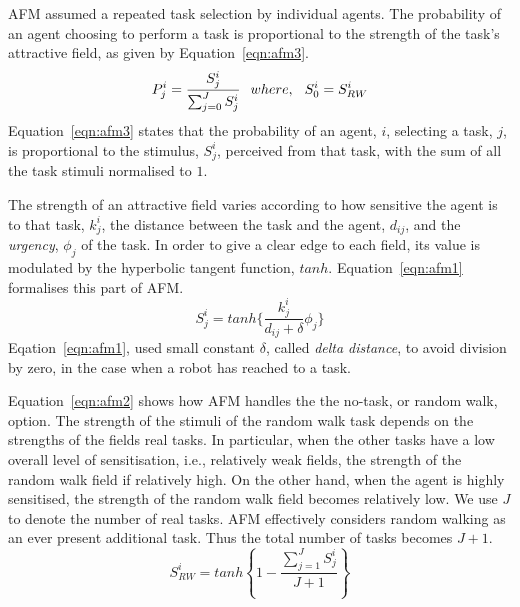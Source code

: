 \documentclass{intech}
\begin{document}
AFM assumed a repeated task selection by individual agents.  The probability of an agent choosing to perform a task is proportional to the strength of the task's attractive field, as given by Equation~\ref{eqn:afm3}.
\begin{equation}
P_{j}^{i} = \frac{S_{j}^{i}}{\sum_{j=0}^{J} S_{j}^{i}} \hspace*{0.25cm}where,\hspace*{0.25cm}S^{i}_{0} = S^{i}_{RW}   
\label{eqn:afm3}
\end{equation}
Equation~\ref{eqn:afm3} states that the probability of an agent, $i$, selecting a task, $j$, is proportional to the stimulus, $ S^i_j$, perceived from that task, with the sum of all the task stimuli normalised to $1$.

The strength of an attractive field varies according to how sensitive the agent is to that task, $k_{j}^{i}$, the distance between the task and the agent, $d_{ij}$, and the {\em urgency}, $\phi _{j}$ of the task.  In order to give a clear edge to each field, its value is modulated by the hyperbolic tangent function, $tanh$.  Equation~\ref{eqn:afm1} formalises this part of AFM.
\begin{equation}
S_{j}^{i} = tanh\{\frac{k_{j}^{i}}{d_{ij}+\delta } \phi _{j}\}
\label{eqn:afm1}
\end{equation}
Eqation~\ref{eqn:afm1}, used small constant $\delta$, called {\em delta distance}, to avoid division by zero, in the case when a robot has reached to a task.

Equation~\ref{eqn:afm2} shows how AFM handles the the no-task, or random walk, option.  The strength of the stimuli of the random walk task depends on the strengths of the fields real tasks.  In particular, when the other tasks have a low overall level of sensitisation, i.e., relatively weak fields, the strength of the random walk field if relatively high.  On the other hand, when the agent is highly sensitised, the strength of the random walk field becomes relatively low.  We use $J$ to denote the number of real tasks.  AFM effectively considers random walking as an ever present additional task.  Thus the total number of tasks becomes $J+1$. %
\begin{equation}
S^{i}_{RW} = tanh \left \{ 1 -  \frac{ \sum_{j=1}^{J} S^{i}_{j}}{J + 1} \right \}
\label{eqn:afm2}
\end{equation}
\end{document}
